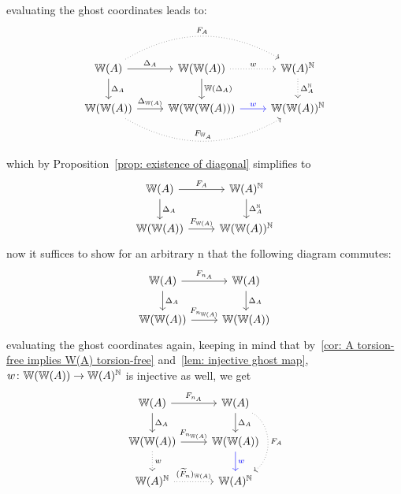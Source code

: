 \begin{bigproof}
\begin{claim*}
    \end{claim*}
    \begin{smallproof}
        evaluating the ghost coordinates leads to:
        \[
            \begin{tikzcd}
                \W(A) \arrow[r,"\Delta_A",] \arrow[d,"\Delta_A"] \arrow[rr,bend left,"F_A",dotted]
                 & \W(\W(A)) \arrow[d,"\W(\Delta_A)"] \arrow[r,"w",dotted] 
                 & \W(A)^{\N} \arrow[d,"\Delta_A^{\N}",dotted]\\
                \W(\W(A)) \arrow[r,"\Delta_{\W(A)}"] \arrow[rr,bend right,"F_{\W_A}",dotted]
                  & \W(\W(\W(A))) \arrow[r,"w",blue]
                  & \W(\W(A))^{\N}
            \end{tikzcd}  
        \]
        which by Proposition~\ref{prop: existence of diagonal} simplifies to
        \[
            \begin{tikzcd}
                \W(A) \arrow[r,"F_A"] \arrow[d,"\Delta_A"] 
                 & \W(A)^{\N} \arrow[d,"\Delta_A^{\N}"] \\
                \W(\W(A)) \arrow[r,"F_{\W(A)}"]
                  & \W(\W(A))^{\N}
            \end{tikzcd}
        \]
        now it suffices to show for an arbitrary n that the following diagram commutes:
        \[
            \begin{tikzcd}
                \W(A) \arrow[r,"F_{n_A}"] \arrow[d,"\Delta_A"] 
                 & \W(A) \arrow[d,"\Delta_A"] \\
                \W(\W(A)) \arrow[r,"F_{n_{\W(A)}}"]
                  & \W(\W(A))
            \end{tikzcd}
        \]
        evaluating the ghost coordinates again, keeping in mind that 
        by~\ref{cor: A torsion-free implies W(A) torsion-free}
        and~\ref{lem: injective ghost map}, 
        $w \colon \mathbb{W}(\mathbb{W}(A)) \to \mathbb{W}(A)^{\mathbb{N}}$ is injective as well, we get
        \[
            \begin{tikzcd}
                \W(A) \arrow[r,"F_{n_A}"] \arrow[d,"\Delta_A"] 
                 & \W(A) \arrow[d,"\Delta_A"] \arrow[dd,bend left = 60,"F_A",dotted]\\
                \W(\W(A)) \arrow[r,"F_{n_{\W(A)}}"] \arrow[d,"w",dotted]
                  & \W(\W(A)) \arrow[d,"w",blue] \\
                \W(A)^{\N} \arrow[r,"(\widetilde{F}_n)_{\W(A)}",dotted]
                & \W(A)^{\N}
            \end{tikzcd}
        \]

\end{smallproof}
\end{bigproof}
